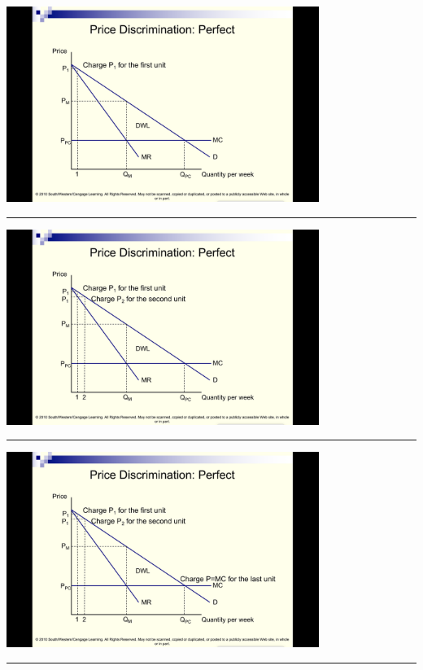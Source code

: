 \documentclass[]{article}
\begin{document}
\includegraphics[height=2.5in]{picsfigs/ppd3.png}

\begin{center}\rule{0.5\linewidth}{\linethickness}\end{center}

\includegraphics[height=2.5in]{picsfigs/ppd4.png}

\begin{center}\rule{0.5\linewidth}{\linethickness}\end{center}

\includegraphics[height=2.5in]{picsfigs/ppd5.png}

\begin{center}\rule{0.5\linewidth}{\linethickness}\end{center}
\end{document}
